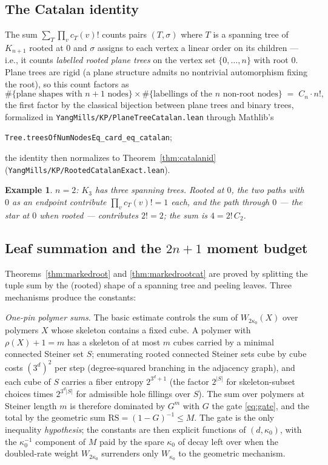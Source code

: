 \documentclass[11pt]{article}
\newtheorem{example}[theorem]{Example}
\newcommand{\lean}[1]{\texttt{#1}}
\begin{document}
\subsection{The Catalan identity}\label{sec:archcatalan}

The sum $\sum_T \prod_v c_T(v)!$ counts pairs $(T, \sigma)$ where $T$
is a spanning tree of $K_{n+1}$ rooted at $0$ and $\sigma$ assigns to
each vertex a linear order on its children --- i.e., it counts
\emph{labelled rooted plane trees} on the vertex set $\{0,\dots,n\}$
with root $0$.  Plane trees are rigid (a plane structure admits no
nontrivial automorphism fixing the root), so this count factors as
\[
\#\{\text{plane shapes with } n+1 \text{ nodes}\} \times
\#\{\text{labellings of the } n \text{ non-root nodes}\}
\;=\; C_n \cdot n! ,
\]
the first factor by the classical bijection between plane trees and
binary trees, formalized in \lean{YangMills/KP/PlaneTreeCatalan.lean}
through Mathlib's
\begin{center}\small
\lean{Tree.treesOfNumNodesEq\_card\_eq\_catalan};
\end{center}
\noindent the identity then normalizes to
Theorem~\ref{thm:catalanid}
(\lean{YangMills/KP/RootedCatalanExact.lean}).

\begin{example}
$n = 2$: $K_3$ has three spanning trees.  Rooted at $0$, the two
paths with $0$ as an endpoint contribute $\prod_v c_T(v)! = 1$ each,
and the path through $0$ --- the star at $0$ when rooted ---
contributes $2! = 2$; the sum is $4 = 2!\,C_2$.
\end{example}

\subsection{Leaf summation and the $2n+1$ moment budget}
\label{sec:archleaf}

Theorems~\ref{thm:markedroot} and \ref{thm:markedrootcat} are proved
by splitting the tuple sum by the (rooted) shape of a spanning tree
and peeling leaves.  Three mechanisms produce the constants:

\emph{One-pin polymer sums.}  The basic estimate controls the sum of
$W_{2\kappa_0}(X)$ over polymers $X$ whose skeleton contains a fixed
cube.  A polymer with $\rho(X) + 1 = m$ has a skeleton of at most $m$
cubes carried by a minimal connected Steiner set $S$; enumerating
rooted connected Steiner sets cube by cube costs $(3^d)^2$ per step
(degree-squared branching in the adjacency graph), and each cube of
$S$ carries a fiber entropy $2^{3^d+1}$ (the factor $2^{|S|}$ for
skeleton-subset choices times $2^{3^d|S|}$ for admissible hole
fillings over $S$).  The sum over polymers at Steiner length $m$ is
therefore dominated by $G^m$ with $G$ the gate \eqref{eq:gate}, and
the total by the geometric sum $\mathrm{RS} = (1-G)^{-1} \le M$.
The gate is the only inequality \emph{hypothesis}; the constants are
then explicit functions of $(d, \kappa_0)$, with the $\kappa_0^{-1}$
component of $M$ paid by the spare $\kappa_0$ of decay left over when
the doubled-rate weight $W_{2\kappa_0}$ surrenders only $W_{\kappa_0}$
to the geometric mechanism.
\end{document}
